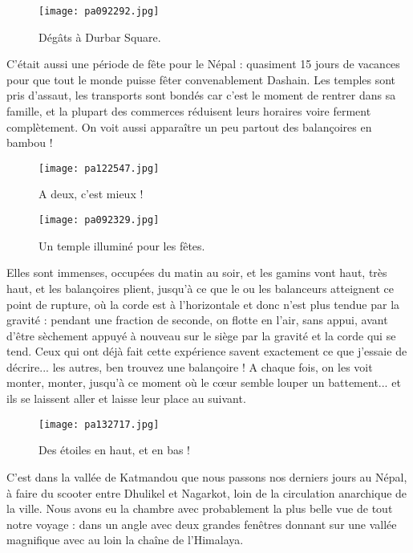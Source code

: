 \documentclass{book}
\begin{document}
\begin{figure}[h]
\centering
\texttt{[image: pa092292.jpg]}
\caption*{Dégâts à Durbar Square.}
\end{figure}

C'était aussi une période de fête pour le Népal : quasiment 15 jours de vacances pour que tout le monde puisse fêter convenablement Dashain. Les temples sont pris d'assaut, les transports sont bondés car c'est le moment de rentrer dans sa famille, et la plupart des commerces réduisent leurs horaires voire ferment complètement. On voit aussi apparaître un peu partout des balançoires en bambou !


\begin{figure}[h]
\centering
\texttt{[image: pa122547.jpg]}
\caption*{A deux, c'est mieux !}
\end{figure}


\begin{figure}[h]
\centering
\texttt{[image: pa092329.jpg]}
\caption*{Un temple illuminé pour les fêtes.}
\end{figure}

Elles sont immenses, occupées du matin au soir, et les gamins vont haut, très haut, et les balançoires plient, jusqu'à ce que le ou les balanceurs atteignent ce point de rupture, où la corde est à l'horizontale et donc n'est plus tendue par la gravité : pendant une fraction de seconde, on flotte en l'air, sans appui, avant d'être sèchement appuyé à nouveau sur le siège par la gravité et la corde qui se tend. Ceux qui ont déjà fait cette expérience savent exactement ce que j'essaie de décrire... les autres, ben trouvez une balançoire ! A chaque fois, on les voit monter, monter, jusqu'à ce moment où le cœur semble louper un battement... et ils se laissent aller et laisse leur place au suivant.


\begin{figure}[h]
\centering
\texttt{[image: pa132717.jpg]}
\caption*{Des étoiles en haut, et en bas !}
\end{figure}

C'est dans la vallée de Katmandou que nous passons nos derniers jours au Népal, à faire du scooter entre Dhulikel et Nagarkot, loin de la circulation anarchique de la ville. Nous avons eu la chambre avec probablement la plus belle vue de tout notre voyage : dans un angle avec deux grandes fenêtres donnant sur une vallée magnifique avec au loin la chaîne de l'Himalaya.
\end{document}
